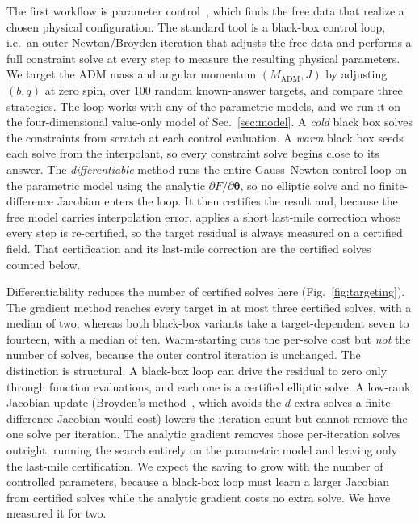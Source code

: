 \documentclass[
  aps,
  prd,
  twocolumn,
  10pt,
  amsmath,
  amssymb,
  nofootinbib,
  superscriptaddress,
  floatfix,
]{revtex4-2}
\newcommand{\vect}[1]{\boldsymbol{#1}}
\newcommand{\Madm}{M_{\mathrm{ADM}}}
\newif\ifshowreferee \showrefereetrue
\newcommand{\refereetext}[1]{\ifshowreferee{\color{refereepurple}#1}\else#1\fi}
\begin{document}
The first workflow is parameter control~\cite{Mendes2025}, which finds the free data that
realize a chosen physical configuration. The standard tool is a black-box control
loop, i.e.\ an outer Newton/Broyden iteration that adjusts the free data and performs a
full constraint solve at every step to measure the resulting physical parameters. We
target the ADM mass and angular momentum $(\Madm,J)$ by adjusting $(b,q)$ at zero
spin, over $100$ random known-answer targets, and compare three strategies.
The loop works with any of the parametric models, and we run it on the four-dimensional value-only model of Sec.~\ref{sec:model}.
A \emph{cold} black box
solves the constraints from scratch at each control evaluation. A \emph{warm} black
box seeds each solve from the interpolant, so every constraint solve begins close to
its answer. The \emph{differentiable} method runs the entire Gauss--Newton control
loop on the parametric model using the analytic $\partial F/\partial\vect{\theta}$, so
no elliptic solve and no finite-difference Jacobian enters the loop. It then
certifies the result and, because the free model carries interpolation error, applies
a short last-mile correction whose every step is re-certified, so the target residual
is always measured on a certified field. That certification and its last-mile
correction are the certified solves counted below.

\refereetext{Differentiability reduces the number of certified solves here}
(Fig.~\ref{fig:targeting}). The gradient method reaches every target in at most
three certified solves, with a median of two, whereas both black-box variants take a
target-dependent seven to fourteen, with a median of ten.
Warm-starting cuts the per-solve cost but \emph{not}
the number of solves, because the outer control iteration is unchanged.
The distinction is structural. A
black-box loop can drive the residual to zero only through function evaluations, and
each one is a certified elliptic solve.
A low-rank Jacobian update (Broyden's method~\cite{Mendes2025},
which avoids the $d$ extra solves a finite-difference Jacobian would cost) lowers
the iteration count but cannot remove the one solve per iteration. The analytic
gradient removes those per-iteration solves outright, running the search entirely on
the parametric model and leaving only the last-mile certification.
We expect the saving to grow with the number of controlled parameters, because a black-box loop must learn a larger Jacobian from certified solves while the analytic gradient costs no extra solve.
We have measured it for two.
\end{document}
